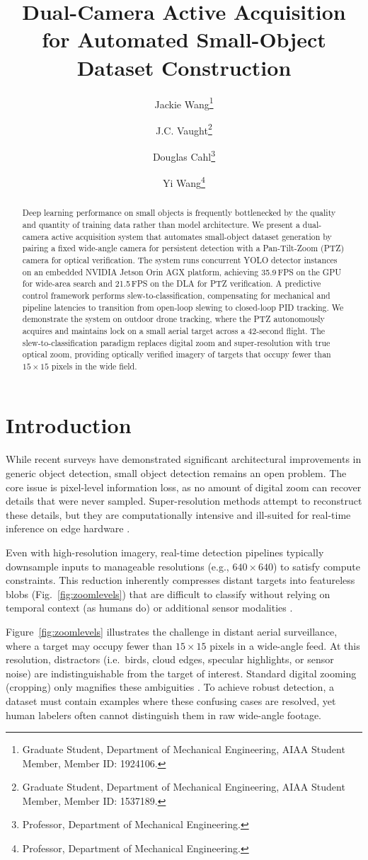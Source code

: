 \documentclass[conf]{new-aiaa}
\title{Dual-Camera Active Acquisition for Automated Small-Object Dataset Construction}
\author{Jackie Wang\footnote{Graduate Student, Department of Mechanical Engineering, AIAA Student Member, Member ID: 1924106.}}
\author{J.C. Vaught\footnote{Graduate Student, Department of Mechanical Engineering, AIAA Student Member, Member ID: 1537189.}}
\author{Douglas Cahl\footnote{Professor, Department of Mechanical Engineering.}}
\author{Yi Wang\footnote{Professor, Department of Mechanical Engineering.}}
\affil{Department of Mechanical Engineering, University of South Carolina, Columbia, SC, 29208}
\begin{document}
\maketitle

\begin{abstract}
Deep learning performance on small objects is frequently bottlenecked by the quality and quantity of training data rather than model architecture. We present a dual-camera active acquisition system that automates small-object dataset generation by pairing a fixed wide-angle camera for persistent detection with a Pan-Tilt-Zoom (PTZ) camera for optical verification. The system runs concurrent YOLO detector instances on an embedded NVIDIA Jetson Orin AGX platform, achieving 35.9\,FPS on the GPU for wide-area search and 21.5\,FPS on the DLA for PTZ verification. A predictive control framework performs slew-to-classification, compensating for mechanical and pipeline latencies to transition from open-loop slewing to closed-loop PID tracking. We demonstrate the system on outdoor drone tracking, where the PTZ autonomously acquires and maintains lock on a small aerial target across a 42-second flight. The slew-to-classification paradigm replaces digital zoom and super-resolution with true optical zoom, providing optically verified imagery of targets that occupy fewer than $15 \times 15$ pixels in the wide field.
\end{abstract}

\section{Introduction}
While recent surveys \cite{chen2020survey, nikouei2024smallobj} have demonstrated significant architectural improvements in generic object detection, small object detection remains an open problem. The core issue is pixel-level information loss, as no amount of digital zoom can recover details that were never sampled. Super-resolution methods attempt to reconstruct these details, but they are computationally intensive and ill-suited for real-time inference on edge hardware \cite{mahaur2022superres}.
\par
Even with high-resolution imagery, real-time detection pipelines typically downsample inputs to manageable resolutions (e.g., $640 \times 640$) to satisfy compute constraints. This reduction inherently compresses distant targets into featureless blobs (Fig.~\ref{fig:zoomlevels}) that are difficult to classify without relying on temporal context (as humans do) or additional sensor modalities \cite{rozantsev2017flying}.
\par
Figure~\ref{fig:zoomlevels} illustrates the challenge in distant aerial surveillance, where a target may occupy fewer than $15 \times 15$ pixels in a wide-angle feed. At this resolution, distractors (i.e.\ birds, cloud edges, specular highlights, or sensor noise) are indistinguishable from the target of interest. Standard digital zooming (cropping) only magnifies these ambiguities \cite{zhang2019zoom}. To achieve robust detection, a dataset must contain examples where these confusing cases are resolved, yet human labelers often cannot distinguish them in raw wide-angle footage.
\end{document}
